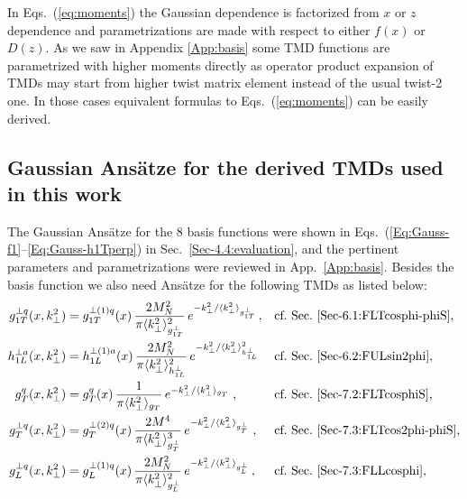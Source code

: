 \documentclass[a4paper,11pt]{article}
\newcommand{\blue}[1]{{\color{blue} #1}}
\newcommand{\la}{\langle}
\newcommand{\ra}{\rangle}
\newcommand{\ps}[1]{\blue{ #1}}
\def\kperp{k_\perp}
\def\avkperp{\la \kperp^2 \ra}
\begin{document}
In Eqs.~(\ref{eq:moments}) the Gaussian dependence is factorized 
from $x$ or $z$ dependence and parametrizations are made with 
respect to either $f(x)$ or $D(z)$. As we saw in Appendix 
\ref{App:basis} some TMD functions are parametrized with higher 
moments directly as operator product expansion of TMDs may start 
from higher twist matrix element instead of the usual twist-2 one. 
In those cases equivalent formulas to Eqs.~(\ref{eq:moments}) can 
be easily derived.

\ps{
\newpage
\subsection{Gaussian Ans\"atze for the derived TMDs used in this work}
\label{App-B:Gauss-Ansatz-non-basis-TMDs}

The Gaussian Ans\"atze for the 8 basis functions were shown 
in Eqs.~(\ref{Eq:Gauss-f1}--\ref{Eq:Gauss-h1Tperp}) in 
Sec.~\ref{Sec-4.4:evaluation}, and the pertinent parameters
and parametrizations were reviewed in App.~\ref{App:basis}.
Besides the basis function we also need Ans\"atze for the 
following TMDs as listed below:
\begin{subequations}\begin{align}
	g_{1T}^{\perp q}(x,\kperp^2) 
	  &=	g_{1T}^{\perp (1) q}(x)\,
		\frac{2 M_N^2}{\pi \avkperp_{g_{1T}^\perp}^2}\,
		e^{-\kperp^2/{\avkperp_{g_{1T}^\perp}}}  \,, 
	  && 	\mbox{cf.\ Sec.~\ref{Sec-6.1:FLTcosphi-phiS},}
		\label{eq:g1t}\\
	h_{1L}^{\perp a}(x,\kperp^2) 
	  &= 	h_{1L}^{\perp (1) a}(x)\,
		\frac{2 M_N^2}{\pi{\avkperp_{h_{1L}^\perp}^2}}\,
		e^{-\kperp^2/{\avkperp_{h_{1L}^\perp}^2}}
	  && 	\mbox{cf.\ Sec.~\ref{Sec-6.2:FULsin2phi},}	
		\label{eq:h1l_final}\\
	g^{q}_{T}(x,\kperp^2) 
	  &=	g^{q}_{T}(x)\,\frac{1}{\pi \avkperp_{g_{T}}}\,
		e^{-\kperp^2/{\avkperp_{g_{T}}}}\;,
	  && 	\mbox{cf.\ Sec.~\ref{Sec-7.2:FLTcosphiS},}	
		\label{eq:gtnew} \\
	g^{\perp q}_{T}(x,\kperp^2) 
	  &= 	g^{\perp (2) q}_{T}(x)\,\frac{2 M^4}{\pi \avkperp^3_{g_{T}^{\perp} }}\,
		e^{-\kperp^2/{\avkperp_{g_{T}^{\perp} }}}\;,
	  && 	\mbox{cf.\ Sec.~\ref{Sec-7.3:FLTcos2phi-phiS},}	
		\label{eq:gtperpnew} \\
	g_{L}^{\perp q}(x,\kperp^2) 
	  &=	g_{L}^{\perp (1) q}(x)\,
		\frac{2 M_N^2}{\pi \avkperp_{g_{L}^\perp}^2}\,
		e^{-\kperp^2/{\avkperp_{g_{L}^\perp}}}  \,, 
	  && 	\mbox{cf.\ Sec.~\ref{Sec-7.3:FLLcosphi},}
		\label{eq:gLperp} \\

\end{align}
\end{subequations}}
\end{document}
